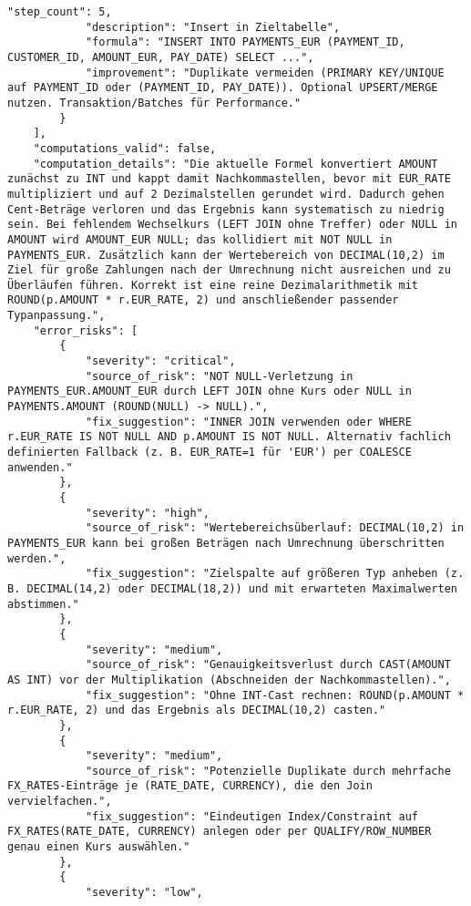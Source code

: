 \begin{lstlisting}[caption={Ausgabe: GPT-5 Anwendungsfall 4 Robustheitsdurchlauf},label={gpt_case4_prompt3}]
            "step_count": 5,
            "description": "Insert in Zieltabelle",
            "formula": "INSERT INTO PAYMENTS_EUR (PAYMENT_ID, CUSTOMER_ID, AMOUNT_EUR, PAY_DATE) SELECT ...",
            "improvement": "Duplikate vermeiden (PRIMARY KEY/UNIQUE auf PAYMENT_ID oder (PAYMENT_ID, PAY_DATE)). Optional UPSERT/MERGE nutzen. Transaktion/Batches für Performance."
        }
    ],
    "computations_valid": false,
    "computation_details": "Die aktuelle Formel konvertiert AMOUNT zunächst zu INT und kappt damit Nachkommastellen, bevor mit EUR_RATE multipliziert und auf 2 Dezimalstellen gerundet wird. Dadurch gehen Cent-Beträge verloren und das Ergebnis kann systematisch zu niedrig sein. Bei fehlendem Wechselkurs (LEFT JOIN ohne Treffer) oder NULL in AMOUNT wird AMOUNT_EUR NULL; das kollidiert mit NOT NULL in PAYMENTS_EUR. Zusätzlich kann der Wertebereich von DECIMAL(10,2) im Ziel für große Zahlungen nach der Umrechnung nicht ausreichen und zu Überläufen führen. Korrekt ist eine reine Dezimalarithmetik mit ROUND(p.AMOUNT * r.EUR_RATE, 2) und anschließender passender Typanpassung.",
    "error_risks": [
        {
            "severity": "critical",
            "source_of_risk": "NOT NULL-Verletzung in PAYMENTS_EUR.AMOUNT_EUR durch LEFT JOIN ohne Kurs oder NULL in PAYMENTS.AMOUNT (ROUND(NULL) -> NULL).",
            "fix_suggestion": "INNER JOIN verwenden oder WHERE r.EUR_RATE IS NOT NULL AND p.AMOUNT IS NOT NULL. Alternativ fachlich definierten Fallback (z. B. EUR_RATE=1 für 'EUR') per COALESCE anwenden."
        },
        {
            "severity": "high",
            "source_of_risk": "Wertebereichsüberlauf: DECIMAL(10,2) in PAYMENTS_EUR kann bei großen Beträgen nach Umrechnung überschritten werden.",
            "fix_suggestion": "Zielspalte auf größeren Typ anheben (z. B. DECIMAL(14,2) oder DECIMAL(18,2)) und mit erwarteten Maximalwerten abstimmen."
        },
        {
            "severity": "medium",
            "source_of_risk": "Genauigkeitsverlust durch CAST(AMOUNT AS INT) vor der Multiplikation (Abschneiden der Nachkommastellen).",
            "fix_suggestion": "Ohne INT-Cast rechnen: ROUND(p.AMOUNT * r.EUR_RATE, 2) und das Ergebnis als DECIMAL(10,2) casten."
        },
        {
            "severity": "medium",
            "source_of_risk": "Potenzielle Duplikate durch mehrfache FX_RATES-Einträge je (RATE_DATE, CURRENCY), die den Join vervielfachen.",
            "fix_suggestion": "Eindeutigen Index/Constraint auf FX_RATES(RATE_DATE, CURRENCY) anlegen oder per QUALIFY/ROW_NUMBER genau einen Kurs auswählen."
        },
        {
            "severity": "low",

\end{lstlisting}
